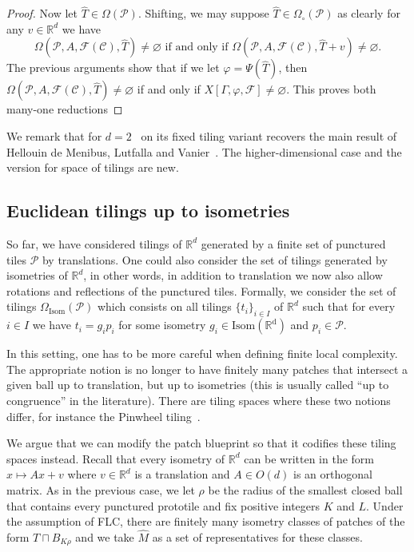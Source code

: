 \documentclass{article}
\theoremstyle{definition}
\theoremstyle{definition}
\newcommand{\RR}{\mathbb{R}}
\newcommand{\PP}{\mathcal{P}}
\newcommand{\FF}{\mathcal{F}}
\begin{document}
\begin{proof}
Now let $\widehat{T}\in \Omega(\PP)$. Shifting, we may suppose $\widehat{T}\in \Omega_{\circ}(\PP)$ as clearly for any $v\in \RR^d$ we have \[\Omega(\PP,A,\FF(\mathcal{C}), \widehat{T})\neq \varnothing \mbox{ if and only if } \Omega(\PP,A,\FF(\mathcal{C}), \widehat{T}+v)\neq \varnothing.\]  The previous arguments show that if we let $\varphi = \Psi(\widehat{T})$, then $\Omega(\PP,A,\FF(\mathcal{C}), \widehat{T})\neq \varnothing$ if and only if $X[\Gamma,\varphi,\FF]\neq \varnothing$. This proves both many-one reductions\end{proof}

We remark that for $d=2$~ on its fixed tiling variant recovers the main result of Hellouin de Menibus, Lutfalla and Vanier~\cite[Theorem 2]{de2024decision}. The higher-dimensional case and the version for space of tilings are new.

\subsection{Euclidean tilings up to isometries}

So far, we have considered tilings of $\RR^d$ generated by a finite set of punctured tiles $\mathcal{P}$ by translations. One could also consider the set of tilings generated by isometries of $\RR^d$, in other words, in addition to translation we now also allow rotations and reflections of the punctured tiles. Formally, we consider the set of tilings $\Omega_{\operatorname{Isom}}(\PP)$ which consists on all tilings $\{t_i\}_{i \in I}$ of $\RR^d$ such that for every $i \in I$ we have $t_i = g_ip_i$ for some isometry $g_i \in \operatorname{Isom(\RR^d)}$ and $p_i \in \mathcal{P}$.

In this setting, one has to be more careful when defining finite local complexity. The appropriate notion is no longer to have finitely many patches that intersect a given ball up to translation, but up to isometries (this is usually called ``up to congruence'' in the literature). There are tiling spaces where these two notions differ, for instance the Pinwheel tiling~\cite{RadinPinwheel_1994}.

We argue that we can modify the patch blueprint so that it codifies these tiling spaces instead. Recall that every isometry of $\RR^d$ can be written in the form $x\mapsto Ax+v$ where $v \in \RR^d$ is a translation and $A \in O(d)$ is an orthogonal matrix. As in the previous case, we let $\rho$ be the radius of the smallest closed ball that contains every punctured prototile and fix positive integers $K$ and $L$. Under the assumption of FLC, there are finitely many isometry classes of patches of the form $T\sqcap B_{K\rho}$ and we take $\widehat{M}$ as a set of  representatives for these classes.
\end{document}
